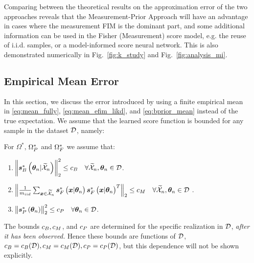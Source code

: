 %
{Comparing between the theoretical results on the {approximation error} of the two approaches reveals 
that the Measurement-Prior Approach will %
have an advantage in cases where the measurement FIM is the dominant part, and some additional information can be used in the Fisher (Measurement) score model,
e.g. the reuse of i.i.d. samples,  or a model-informed score neural network. This is also demonstrated numerically in Fig.~\ref{fig:k_study} and Fig.~\ref{fig:analysis_mi}.    }

\subsection{Empirical Mean Error}\label{sec:empirical_mean_error}
In this section, we discuss the error introduced by using a finite empirical mean in \eqref{eq:mean_fully}, \eqref{eq:mean_efim_likd}, and \eqref{eq:bprior_mean} instead of the true expectation. We 
assume that the %
learned score function is bounded for any sample in the dataset $\mathcal{D}$, namely:
\begin{assumption}\label{assume:bounded_score}
For $\Omega^*$, $\Omega_{P}^*$ and $\Omega_{F}^*$ we assume that:
\begin{enumerate}[label=\text{\ref{assume:bounded_score}}.\arabic*,labelsep=*, leftmargin=*]
    \item\label{assume:bound_post} $\norm{\bm{s}_{B}^*\left(\bm{\theta}_n|\widetilde{\mathcal{X}}_n\right)}_2^2\leq c_B \quad \forall \widetilde{\mathcal{X}}_n,\bm{\theta}_n \in \mathcal{D}$.
    \item \label{assume:bound_fisher}$\norm{\frac{1}{m_{iid}}\sum_{\bm{x}\in\widetilde{\mathcal{X}}_n}\bm{s}_{F}^*\left(\bm{x}|\bm{\theta}_n\right)\bm{s}_{F}^*\left(\bm{x}|\bm{\theta}_n\right)^T}_2\leq c_M \quad \forall  \widetilde{\mathcal{X}}_n,\bm{\theta}_n  \in \mathcal{D} $ .
\item\label{assume:bound_prior} $\norm{\bm{s}_{P}^*\left(\bm{\theta}_n\right)}_2^2\leq c_P \quad \forall  \bm{\theta}_n  \in \mathcal{D}$.
\end{enumerate}
\end{assumption}

{\begin{remark}
The bounds $c_B, c_M$, and $c_P$ are determined for the specific realization in $\mathcal{D}$, \emph{after it has been observed.} {Hence these bounds are functions of $\mathcal{D}$, $c_B=c_B(\mathcal{D}), c_M=c_M(\mathcal{D}), c_P=c_P(\mathcal{D})$, but this dependence will not be shown explicitly.}
\end{remark}
}

